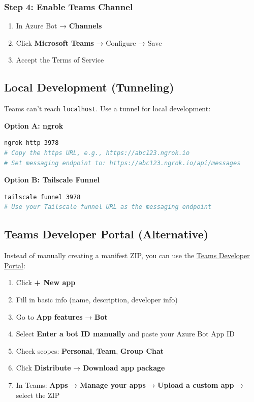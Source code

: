 \subsubsection{Step 4: Enable Teams Channel}


\begin{enumerate}
  \item In Azure Bot → \textbf{Channels}
  \item Click \textbf{Microsoft Teams} → Configure → Save
  \item Accept the Terms of Service
\end{enumerate}


\subsection{Local Development (Tunneling)}


Teams can't reach \texttt{localhost}. Use a tunnel for local development:

\textbf{Option A: ngrok}

\begin{lstlisting}[language=bash]
ngrok http 3978
# Copy the https URL, e.g., https://abc123.ngrok.io
# Set messaging endpoint to: https://abc123.ngrok.io/api/messages
\end{lstlisting}


\textbf{Option B: Tailscale Funnel}

\begin{lstlisting}[language=bash]
tailscale funnel 3978
# Use your Tailscale funnel URL as the messaging endpoint
\end{lstlisting}


\subsection{Teams Developer Portal (Alternative)}


Instead of manually creating a manifest ZIP, you can use the \href{https://dev.teams.microsoft.com/apps}{Teams Developer Portal}:

\begin{enumerate}
  \item Click \textbf{+ New app}
  \item Fill in basic info (name, description, developer info)
  \item Go to \textbf{App features} → \textbf{Bot}
  \item Select \textbf{Enter a bot ID manually} and paste your Azure Bot App ID
  \item Check scopes: \textbf{Personal}, \textbf{Team}, \textbf{Group Chat}
  \item Click \textbf{Distribute} → \textbf{Download app package}
  \item In Teams: \textbf{Apps} → \textbf{Manage your apps} → \textbf{Upload a custom app} → select the ZIP
\end{enumerate}


